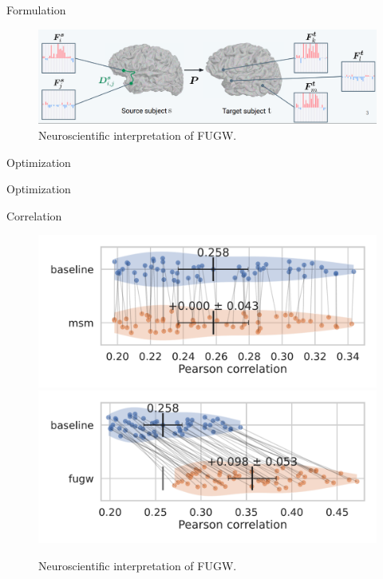 \documentclass{beamer}
\begin{document}
\begin{frame}{Formulation}
\vspace{-0.6cm}
\begin{figure}
  \centering
  \includegraphics[width=1.\linewidth, keepaspectratio=true]{OT_new/fugw.png}
  \caption*{\scriptsize{Neuroscientific interpretation of FUGW.}}
\end{figure}
\end{frame}

\begin{frame}{Optimization}

\end{frame}

\begin{frame}{Optimization}

\end{frame}

\begin{frame}{Correlation}

  \begin{figure}
    \centering
    \includegraphics[width=0.49\linewidth, keepaspectratio=true]{OT_new/fsaverage5_alignment_correlation_gain_msm.pdf}
    \includegraphics[width=0.49\linewidth, keepaspectratio=true]{OT_new/fsaverage5_alignment_correlation_gain_fugw.pdf}
    \caption*{\scriptsize{Neuroscientific interpretation of FUGW.}}
  \end{figure}
\end{frame}
\end{document}
